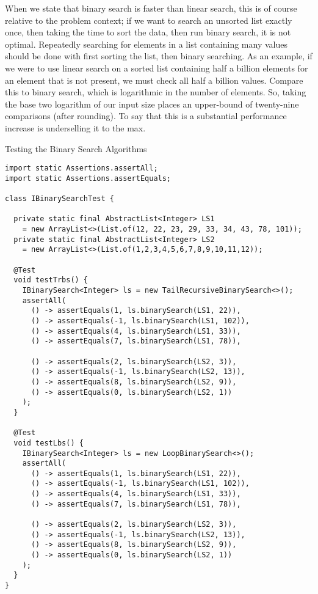 When we state that binary search is faster than linear search, this is of course relative to the problem context; if we want to search an unsorted list exactly once, then taking the time to sort the data, then run binary search, it is not optimal. Repeatedly searching for elements in a list containing many values should be done with first sorting the list, then binary searching. As an example, if we were to use linear search on a sorted list containing half a billion elements for an element that is not present, we must check all half a billion values. Compare this to binary search, which is logarithmic in the number of elements. So, taking the base two logarithm of our input size places an upper-bound of twenty-nine comparisons (after rounding). To say that this is a substantial performance increase is underselling it to the max.

\begin{cl}{Testing the Binary Search Algorithms}
\begin{lstlisting}[language=MyJava]
import static Assertions.assertAll;
import static Assertions.assertEquals;

class IBinarySearchTest {
  
  private static final AbstractList<Integer> LS1 
    = new ArrayList<>(List.of(12, 22, 23, 29, 33, 34, 43, 78, 101));
  private static final AbstractList<Integer> LS2 
    = new ArrayList<>(List.of(1,2,3,4,5,6,7,8,9,10,11,12));

  @Test
  void testTrbs() {
    IBinarySearch<Integer> ls = new TailRecursiveBinarySearch<>();
    assertAll(
      () -> assertEquals(1, ls.binarySearch(LS1, 22)),
      () -> assertEquals(-1, ls.binarySearch(LS1, 102)),
      () -> assertEquals(4, ls.binarySearch(LS1, 33)),
      () -> assertEquals(7, ls.binarySearch(LS1, 78)),

      () -> assertEquals(2, ls.binarySearch(LS2, 3)),
      () -> assertEquals(-1, ls.binarySearch(LS2, 13)),
      () -> assertEquals(8, ls.binarySearch(LS2, 9)),
      () -> assertEquals(0, ls.binarySearch(LS2, 1))
    );
  }
  
  @Test
  void testLbs() {
    IBinarySearch<Integer> ls = new LoopBinarySearch<>();
    assertAll(
      () -> assertEquals(1, ls.binarySearch(LS1, 22)),
      () -> assertEquals(-1, ls.binarySearch(LS1, 102)),
      () -> assertEquals(4, ls.binarySearch(LS1, 33)),
      () -> assertEquals(7, ls.binarySearch(LS1, 78)),

      () -> assertEquals(2, ls.binarySearch(LS2, 3)),
      () -> assertEquals(-1, ls.binarySearch(LS2, 13)),
      () -> assertEquals(8, ls.binarySearch(LS2, 9)),
      () -> assertEquals(0, ls.binarySearch(LS2, 1))
    );
  }
}
\end{lstlisting}
\end{cl}

